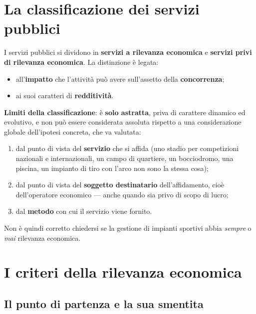 \section{La classificazione dei servizi pubblici}

I servizi pubblici si dividono in \textbf{servizi a rilevanza economica} e \textbf{servizi privi di
rilevanza economica}. La distinzione è legata:

\begin{itemize}
  \item all'\textbf{impatto} che l'attività può avere sull'assetto della \textbf{concorrenza};
  \item ai suoi caratteri di \textbf{redditività}.
\end{itemize}

\textbf{Limiti della classificazione}: è \textbf{solo astratta}, priva di carattere dinamico ed
evolutivo, e non può essere considerata assoluta rispetto a una considerazione globale
dell'ipotesi concreta, che va valutata:

\begin{enumerate}
  \item dal punto di vista del \textbf{servizio} che si affida (uno stadio per competizioni
    nazionali e internazionali, un campo di quartiere, un bocciodromo, una piscina, un impianto di
    tiro con l'arco non sono la stessa cosa);
  \item dal punto di vista del \textbf{soggetto destinatario} dell'affidamento, cioè
    dell'operatore economico --- anche quando sia privo di scopo di lucro;
  \item dal \textbf{metodo} con cui il servizio viene fornito.
\end{enumerate}

Non è quindi corretto chiedersi se la gestione di impianti sportivi abbia \emph{sempre} o
\emph{mai} rilevanza economica.

\section{I criteri della rilevanza economica}

\subsection{Il punto di partenza e la sua smentita}

